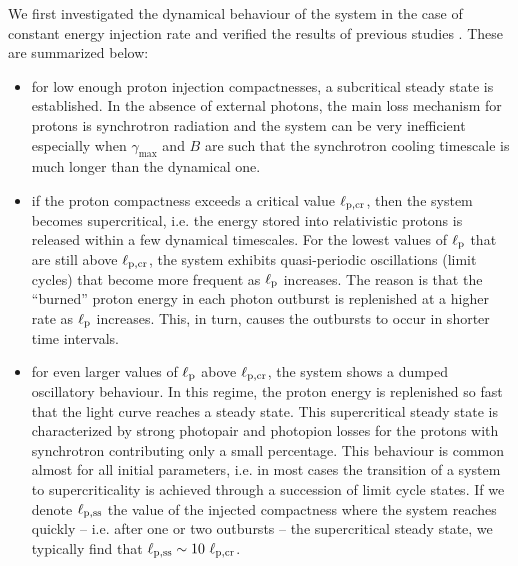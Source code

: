 \documentclass[fleqn,usenatbib]{mnras}
\newcommand{\lp}{\ell_{\rm p}}
\newcommand{\lpcrss}{\ell_{\rm p, ss}}
\newcommand{\lpcr}{\ell_{\rm p,cr}}
\newcommand{\gmx}{\gamma_{\max}}
\begin{document}
{We first investigated the dynamical behaviour of the system in the case of  constant energy injection rate and verified the results of previous studies \citep{sternsvensson91, mastetal05, petromast12b}. These are summarized below:
\begin{itemize}
 \item for low enough proton injection compactnesses, a subcritical steady state is established. In the absence of external photons, the main loss mechanism for protons is  synchrotron radiation and the system can be very inefficient especially when $\gmx$   and $B$ are such that  the synchrotron cooling timescale is much longer than the dynamical one. 
 \item if the proton compactness exceeds a critical value $\lpcr$, then the system becomes supercritical, i.e. the energy stored into relativistic protons is released within a few dynamical timescales. For the lowest values of   $\lp$ that are still above $\lpcr$, the system exhibits quasi-periodic oscillations (limit cycles) that become more frequent as $\lp$ increases. The reason is that the ``burned'' proton energy  in each photon outburst is replenished at a higher rate as $\lp$ increases. This, in turn, causes the outbursts to occur in shorter time intervals. 
 \item for even larger values of $\lp$ above $\lpcr$, the system shows a dumped oscillatory behaviour. In this regime, the  proton energy 
is replenished so fast that the light curve reaches a steady state. This supercritical steady state is characterized by strong photopair and photopion  losses for the  protons with synchrotron contributing only a small percentage. 
This behaviour is common almost for all initial parameters, i.e. in most cases the transition of a system
 to supercriticality  is achieved through a succession of limit cycle states.
  If we denote $\lpcrss$ the value of the injected compactness where the system reaches quickly -- i.e. after one or two outbursts  -- the supercritical steady state,  we typically find that $\lpcrss \sim 10\ \lpcr$.
\end{itemize}

}
\end{document}
